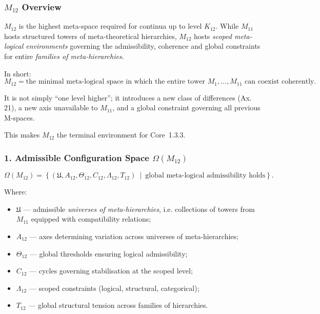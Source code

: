 

\subsubsection{$M_{12}$ Overview}
\label{sec:m12-overview}

$M_{12}$ is the highest meta-space required for continua up to level $K_{12}$.  
While $M_{11}$ hosts structured towers of meta-theoretical hierarchies,  
$M_{12}$ hosts \emph{scoped meta-logical environments} governing the  
admissibility, coherence and global constraints for entire \emph{families of  
meta-hierarchies}.

In short:  
\[
M_{12} = \text{the minimal meta-logical space in which the entire tower }
M_1, \ldots, M_{11} \text{ can coexist coherently.}
\]

It is not simply “one level higher”;  
it introduces a new class of differences (Ax. 21),  
a new axis unavailable to $M_{11}$,  
and a global constraint governing all previous M-spaces.

This makes $M_{12}$ the terminal environment for Core~1.3.3.

\subsubsection*{1. Admissible Configuration Space $\Omega(M_{12})$}

\[
\Omega(M_{12}) =
\left\{
\left( \mathfrak{U}, A_{12}, \Theta_{12},
C_{12}, \Lambda_{12}, T_{12} \right)
\ \middle|\
\text{global meta-logical admissibility holds}
\right\}.
\]

Where:

\begin{itemize}
    \item $\mathfrak{U}$ — admissible \emph{universes of meta-hierarchies},  
          i.e. collections of towers from $M_{11}$ equipped with compatibility relations;
    \item $A_{12}$ — axes determining variation across universes of meta-hierarchies;
    \item $\Theta_{12}$ — global thresholds ensuring logical admissibility;
    \item $C_{12}$ — cycles governing stabilisation at the scoped level;
    \item $\Lambda_{12}$ — scoped constraints (logical, structural, categorical);
    \item $T_{12}$ — global structural tension across families of hierarchies.
\end{itemize}

